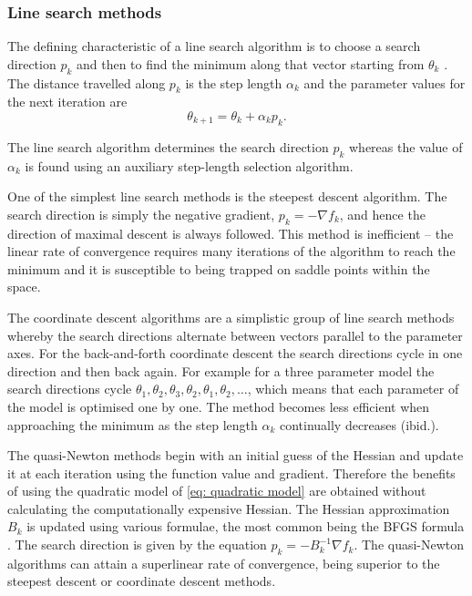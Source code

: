 \begin{htmlonly}
\begin{htmlonly}
\subsubsection{Line search methods}

The defining characteristic of a line search algorithm is to choose a search direction $p_k$ and then to find the minimum along that vector starting from $\theta_k$ \citep{NocedalWright99}.  The distance travelled along $p_k$ is the step length $\alpha_k$ and the parameter values for the next iteration are
\begin{equation}
 \theta_{k+1} = \theta_k + \alpha_k p_k.
\end{equation}

\noindent  The line search algorithm determines the search direction $p_k$ whereas the value of $\alpha_k$ is found using an auxiliary step-length selection algorithm.

One of the simplest line search methods is the steepest descent algorithm.  The search direction is simply the negative gradient, $p_k = -\nabla f_k$, and hence the direction of maximal descent is always followed.  This method is inefficient -- the linear rate of convergence requires many iterations of the algorithm to reach the minimum and it is susceptible to being trapped on saddle points within the space.

The coordinate descent algorithms are a simplistic group of line search methods whereby the search directions alternate between vectors parallel to the parameter axes.  For the back-and-forth coordinate descent the search directions cycle in one direction and then back again.  For example for a three parameter model the search directions cycle $\theta_1, \theta_2, \theta_3, \theta_2, \theta_1, \theta_2, \hdots$, which means that each parameter of the model is optimised one by one.  The method becomes less efficient when approaching the minimum as the step length $\alpha_k$ continually decreases (ibid.).

The quasi-Newton methods begin with an initial guess of the Hessian and update it at each iteration using the function value and gradient.  Therefore the benefits of using the quadratic model of \eqref{eq: quadratic model} are obtained without calculating the computationally expensive Hessian.  The Hessian approximation $B_k$ is updated using various formulae, the most common being the BFGS formula \citep{Broyden70,Fletcher70,Goldfarb70,Shanno70}.  The search direction is given by the equation $p_k = -B_k^{-1} \nabla f_k$.  The quasi-Newton algorithms can attain a superlinear rate of convergence, being superior to the steepest descent or coordinate descent methods.


\end{htmlonly}
\end{htmlonly}
